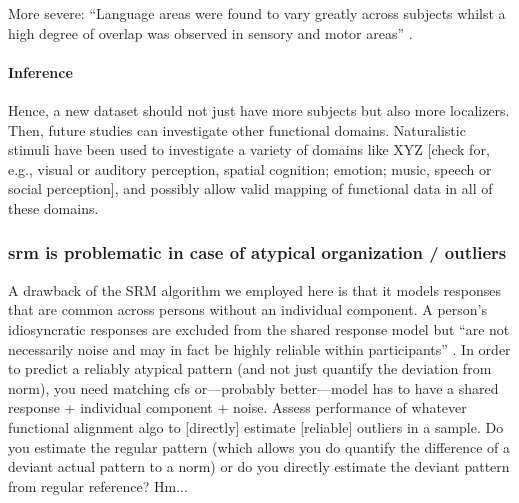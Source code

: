 %
More severe: ``Language areas were found to vary greatly across subjects whilst
a high degree of overlap was observed in sensory and motor areas''
\citep{frost2012measuring}.


\paragraph{Inference}



%
Hence, a new dataset should not just have more subjects but also more
localizers.
%
Then, future studies can investigate other functional domains.
%
Naturalistic stimuli have been used to investigate a variety of domains like XYZ
[check for, e.g., visual or auditory perception, spatial cognition; emotion;
music, speech or social perception], and possibly allow valid mapping of
functional data in all of these domains.


\subsubsection{\ac{srm} is problematic in case of atypical organization /
outliers}


%
A drawback of the SRM algorithm we employed here is that it models responses
that are common across persons without an individual component.
%
A person's idiosyncratic responses are excluded from the shared response model
but ``are not necessarily noise and may in fact be highly reliable within
participants'' \citep{cohen2017computational}.
%
In order to predict a reliably atypical pattern (and not just quantify the
deviation from norm), you need matching \ac{cfs} or---probably better---model
has to have a shared response + individual component + noise.
%
Assess performance of whatever functional alignment algo to [directly] estimate
[reliable] outliers in a sample.
%
Do you estimate the regular pattern (which allows you do quantify the difference
of a deviant actual pattern to a norm) or do you directly estimate the deviant
pattern from regular reference? Hm...

